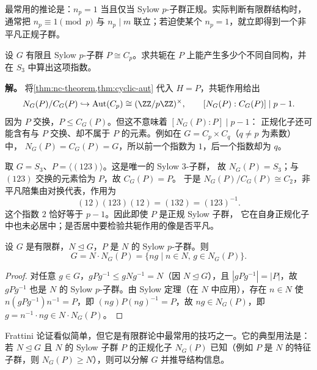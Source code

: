 最常用的推论是：$n_p=1$ 当且仅当 Sylow $p$-子群正规。实际判断有限群结构时，通常把 $n_p\equiv1\pmod p$ 与 $n_p\mid m$ 联立；若迫使某个 $n_p=1$，就立即得到一个非平凡正规子群。

\begin{example}
设 $G$ 有限且 Sylow $p$-子群 $P\cong C_p$。求共轭在 $P$ 上能产生多少个不同自同构，并在 $S_3$ 中算出这项指数。

\textbf{解。} 将\cref{thm:nc-theorem,thm:cyclic-aut} 代入 $H=P$，共轭作用给出
\[
N_G(P)/C_G(P)\hookrightarrow\operatorname{Aut}(C_p)
\cong(\ZZ/p\ZZ)^\times,
\qquad [N_G(P):C_G(P)]\mid p-1.
\]
因为 $P$ 交换，$P\le C_G(P)$。但这不意味着 $[N_G(P):P]\mid p-1$：
正规化子还可能含有与 $P$ 交换、却不属于 $P$ 的元素。例如在
$G=C_p\times C_q$（$q\ne p$ 为素数）中，
$N_G(P)=C_G(P)=G$，所以前一个指数为 $1$，后一个指数却为 $q$。

取 $G=S_3$、$P=\langle(123)\rangle$。这是唯一的 Sylow $3$-子群，
故 $N_G(P)=S_3$；与 $(123)$ 交换的元素恰为 $P$，故 $C_G(P)=P$。
于是 $N_G(P)/C_G(P)\cong C_2$，非平凡陪集由对换代表，作用为
\[
(12)(123)(12)=(132)=(123)^{-1}.
\]
这个指数 $2$ 恰好等于 $p-1$。因此即使 $P$ 是正规 Sylow 子群，
它在自身正规化子中也未必居中；是否居中要检验共轭作用的像是否平凡。
\end{example}

\begin{theorem}[Frattini 论证]
\label{thm:frattini-argument}
设 $G$ 是有限群，$N\mathrel{\trianglelefteq} G$，$P$ 是 $N$ 的 Sylow $p$-子群。则
\[
G=N\cdot N_G(P)=\{ng\mid n\in N,\,g\in N_G(P)\}.
\]
\end{theorem}

\begin{proof}
对任意 $g\in G$，$gPg^{-1}\leqslant gNg^{-1}=N$（因 $N\mathrel{\trianglelefteq} G$），且 $|gPg^{-1}|=|P|$，故 $gPg^{-1}$ 也是 $N$ 的 Sylow $p$-子群。由 Sylow 定理（在 $N$ 中应用），存在 $n\in N$ 使 $n(gPg^{-1})n^{-1}=P$，即 $(ng)P(ng)^{-1}=P$，故 $ng\in N_G(P)$，即 $g=n^{-1}\cdot ng\in N\cdot N_G(P)$。
\end{proof}

Frattini 论证看似简单，但它是有限群论中最常用的技巧之一。它的典型用法是：若 $N\mathrel{\trianglelefteq} G$ 且 $N$ 的 Sylow 子群 $P$ 的正规化子 $N_G(P)$ 已知（例如 $P$ 是 $N$ 的特征子群，则 $N_G(P)\geqslant N$），则可以分解 $G$ 并推导结构信息。

